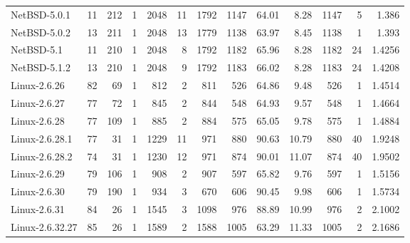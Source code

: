 \documentclass[11pt]{article}
\begin{document}
\begin{center}
\begin{tabular}{lrrrrrrrrrrrr}
 NetBSD-5.0.1           &     11  &     212  &                  1  &     2048  &    11  &      1792  &       1147  &    64.01  &     8.28  &    1147  &    5  &    1.386  \\
 NetBSD-5.0.2           &     13  &     211  &                  1  &     2048  &    13  &      1779  &       1138  &    63.97  &     8.45  &    1138  &    1  &    1.393  \\
 NetBSD-5.1             &     11  &     210  &                  1  &     2048  &     8  &      1792  &       1182  &    65.96  &     8.28  &    1182  &   24  &   1.4256  \\
 NetBSD-5.1.2           &     13  &     210  &                  1  &     2048  &     9  &      1792  &       1183  &    66.02  &     8.28  &    1183  &   24  &   1.4208  \\
\hline
\hline
 Linux-2.6.26           &     82  &      69  &                  1  &      812  &     2  &       811  &        526  &    64.86  &     9.48  &     526  &    1  &   1.4514  \\
 Linux-2.6.27           &     77  &      72  &                  1  &      845  &     2  &       844  &        548  &    64.93  &     9.57  &     548  &    1  &   1.4664  \\
 Linux-2.6.28           &     77  &     109  &                  1  &      885  &     2  &       884  &        575  &    65.05  &     9.78  &     575  &    1  &   1.4884  \\
 Linux-2.6.28.1         &     77  &      31  &                  1  &     1229  &    11  &       971  &        880  &    90.63  &    10.79  &     880  &   40  &   1.9248  \\
 Linux-2.6.28.2         &     74  &      31  &                  1  &     1230  &    12  &       971  &        874  &    90.01  &    11.07  &     874  &   40  &   1.9502  \\
 Linux-2.6.29           &     79  &     106  &                  1  &      908  &     2  &       907  &        597  &    65.82  &     9.76  &     597  &    1  &   1.5156  \\
 Linux-2.6.30           &     79  &     190  &                  1  &      934  &     3  &       670  &        606  &    90.45  &     9.98  &     606  &    1  &   1.5734  \\
 Linux-2.6.31           &     84  &      26  &                  1  &     1545  &     3  &      1098  &        976  &    88.89  &    10.99  &     976  &    2  &   2.1002  \\
 Linux-2.6.32.27        &     85  &      26  &                  1  &     1589  &     2  &      1588  &       1005  &    63.29  &    11.33  &    1005  &    2  &   2.1686  \\

\end{tabular}
\end{center}
\end{document}
